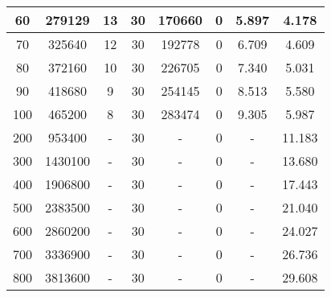 \documentclass{acmsiggraph}
\begin{document}
\begin{table}[h]
\begin{tabular}{|c|c|c|c|c|c|c|c|}
    \hline
                    60 & 279129                 & 13 & 30                  & 170660& 0                                     & 5.897 & 4.178                              \\   
    \hline
                    70 & 325640                 & 12 & 30                  & 192778& 0                                     & 6.709 & 4.609                              \\   
    \hline
                    80 & 372160                 & 10 & 30                  & 226705& 0                                     & 7.340 & 5.031                              \\   
    \hline
                    90 & 418680                 & 9  & 30                  & 254145& 0                                     & 8.513 & 5.580                              \\   
    \hline
                    100& 465200                 & 8  & 30                  & 283474& 0                                     & 9.305 & 5.987                              \\   
    \hline
                    200& 953400                 & -  & 30                  & -     & 0                                     & -     & 11.183                             \\   
    \hline
                    300& 1430100                & -  & 30                  & -     & 0                                     & -     & 13.680                             \\
    \hline
                    400& 1906800                & -  & 30                  & -     & 0                                     & -     & 17.443                             \\
    \hline
                    500& 2383500                & -  & 30                  & -     & 0                                     & -     & 21.040                             \\
    \hline
                    600& 2860200                & -  & 30                  & -     & 0                                     & -     & 24.027                             \\
    \hline
                    700& 3336900                & -  & 30                  & -     & 0                                     & -     & 26.736                             \\
    \hline
                    800& 3813600                & -  & 30                  & -     & 0                                     & -     & 29.608                             \\

\end{tabular}
\end{table}
\end{document}
